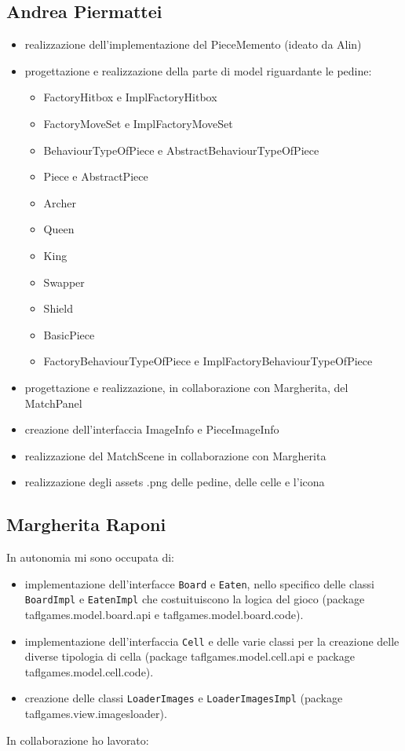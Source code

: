 \documentclass[a4paper,12pt]{report}
\begin{document}
\subsection{Andrea Piermattei}
\begin{itemize}
\item realizzazione dell'implementazione del PieceMemento (ideato da Alin)
\item progettazione e realizzazione della parte di model riguardante le pedine:
\begin{itemize}
\item FactoryHitbox e ImplFactoryHitbox
\item FactoryMoveSet e ImplFactoryMoveSet
\item BehaviourTypeOfPiece e AbstractBehaviourTypeOfPiece
\item Piece e AbstractPiece
\item Archer
\item Queen
\item King
\item Swapper
\item Shield
\item BasicPiece
\item FactoryBehaviourTypeOfPiece e ImplFactoryBehaviourTypeOfPiece
\end{itemize}
\item progettazione e realizzazione, in collaborazione con Margherita, del MatchPanel
\item creazione dell'interfaccia ImageInfo e PieceImageInfo
\item realizzazione del MatchScene in collaborazione con Margherita
\item realizzazione degli assets .png delle pedine, delle celle e l'icona
\end{itemize}

\subsection{Margherita Raponi}
In autonomia mi sono occupata di:
\begin{itemize}
	\item implementazione dell'interfacce \texttt{Board} e \texttt{Eaten}, nello specifico delle classi \texttt{BoardImpl} e \texttt{EatenImpl} che costuituiscono la logica del gioco (package taflgames.model.board.api e taflgames.model.board.code).
	\item implementazione dell'interfaccia \texttt{Cell} e delle varie classi per la creazione delle diverse tipologia di cella (package taflgames.model.cell.api e package taflgames.model.cell.code).
	\item creazione delle classi \texttt{LoaderImages} e \texttt{LoaderImagesImpl} (package taflgames.view.imagesloader).
\end{itemize}
In collaborazione ho lavorato:
\end{document}
